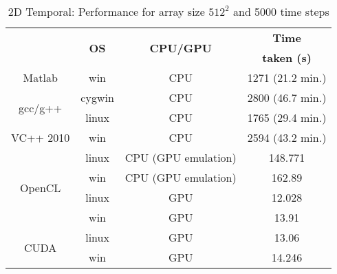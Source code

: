 \begin{table}[H]
\begin{center}
\vspace{0.3cm}
\SingleSpacing
	\begin{tabular}{cccc}
	\hline \hline
		\rule{0pt}{2.6ex} & \multirow{2}{*}{\textbf{OS}} & \multirow{2}{*}{\textbf{CPU/GPU}}  & \textbf{Time}\\
		& &  & \textbf{taken (s)}\\
		\hline
		Matlab \rule{0pt}{2.6ex} & win & CPU &1271 (21.2 min.)\\
		\hline
		\multirow{2}{*}{gcc/g++} \rule{0pt}{2.6ex} & cygwin & CPU &2800 (46.7 min.)\\
		& linux & CPU &1765 (29.4 min.)\\
		\hline
		VC++ 2010 \rule{0pt}{2.6ex} & win & CPU &2594 (43.2 min.)\\
		\hline
		\multirow{4}{*}{OpenCL} \rule{0pt}{2.6ex} & linux & CPU (GPU emulation) &148.771\\
		& win & CPU (GPU emulation) &162.89\\
		& linux & GPU &12.028\\
		& win & GPU &13.91\\
		\hline
		\multirow{2}{*}{CUDA} \rule{0pt}{2.6ex} & linux & GPU &13.06\\
		& win & GPU &14.246\\
	\hline \hline
	\end{tabular}
\end{center}
\caption{2D Temporal: Performance for array size $512^2$ and 5000 time steps}
\label{Tab:Performance-2D-time-5000-steps}
\end{table}
